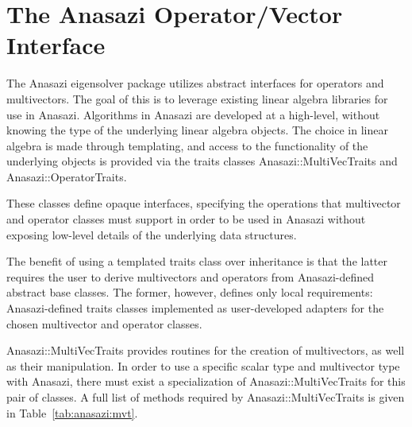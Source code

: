 \section{The Anasazi Operator/Vector Interface}
\label{sec:anasazi:opvec}

The Anasazi eigensolver package utilizes abstract interfaces for operators and
multivectors. The goal of this is to leverage existing linear algebra libraries for use in
Anasazi. Algorithms in Anasazi are developed at a high-level, without knowing the type of
the underlying linear algebra objects. The choice in linear algebra is made through
templating, and access to the functionality of the underlying objects is provided via the
traits classes Anasazi::MultiVecTraits and Anasazi::OperatorTraits.

These classes define opaque interfaces, specifying the operations that multivector and
operator classes must support in order to be used in Anasazi without exposing low-level
details of the underlying data structures. 

The benefit of using a templated traits class over inheritance is that the latter requires
the user to derive multivectors and operators from Anasazi-defined abstract
base classes. The former, however, defines only local requirements: Anasazi-defined traits
classes implemented as user-developed adapters for the chosen multivector and operator
classes.

Anasazi::MultiVecTraits provides routines for the creation of multivectors, as well as
their manipulation. In order to use a specific scalar type and multivector type with
Anasazi, there must exist a specialization of Anasazi::MultiVecTraits for this pair of
classes. A full list of methods required by Anasazi::MultiVecTraits is given in
Table~\ref{tab:anasazi:mvt}.

